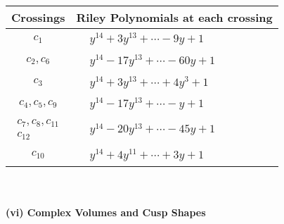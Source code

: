 \documentclass[1p]{elsarticle_modified}
\theoremstyle{definition}
\begin{document}
\begin{tabular}{m{50pt}|m{274pt}}
Crossings & \hspace{64pt}Riley Polynomials at each crossing \\
\hline $$\begin{aligned}c_{1}\end{aligned}$$&$\begin{aligned}
&y^{14}+3 y^{13}+\cdots-9 y+1
\end{aligned}$\\
\hline $$\begin{aligned}c_{2},c_{6}\end{aligned}$$&$\begin{aligned}
&y^{14}-17 y^{13}+\cdots-60 y+1
\end{aligned}$\\
\hline $$\begin{aligned}c_{3}\end{aligned}$$&$\begin{aligned}
&y^{14}+3 y^{13}+\cdots+4 y^3+1
\end{aligned}$\\
\hline $$\begin{aligned}c_{4},c_{5},c_{9}\end{aligned}$$&$\begin{aligned}
&y^{14}-17 y^{13}+\cdots- y+1
\end{aligned}$\\
\hline $$\begin{aligned}c_{7},c_{8},c_{11}\\c_{12}\end{aligned}$$&$\begin{aligned}
&y^{14}-20 y^{13}+\cdots-45 y+1
\end{aligned}$\\
\hline $$\begin{aligned}c_{10}\end{aligned}$$&$\begin{aligned}
&y^{14}+4 y^{11}+\cdots+3 y+1
\end{aligned}$\\
\hline
\end{tabular}\\~\\
\newpage\flushleft \textbf{(vi) Complex Volumes and Cusp Shapes}
\end{document}
